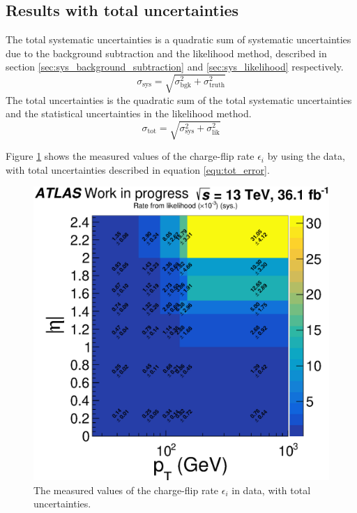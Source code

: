 \subsection{Results with total uncertainties}
\label{sec:charge_flip_results_stat}
The total systematic uncertainties is a quadratic sum of systematic uncertainties due to the background subtraction and the likelihood method, described in section \ref{sec:sys_background_subtraction} and \ref{sec:sys_likelihood} respectively.
\begin{equation}
\sigma_{\text{sys}} = \sqrt{\sigma_{\text{bgk}} ^2+ \sigma_{\text{truth}} ^2}
\end{equation}
The total uncertainties is the quadratic sum of the total systematic uncertainties and the statistical uncertainties in the likelihood method.
\begin{equation}
\sigma_{\text{tot}} = \sqrt{\sigma_{\text{sys}} ^2 + \sigma_{\text{lik}} ^2}
\label{equ:tot_error}
\end{equation}

Figure \ref{fig:charge_flip_data_tot} shows the measured values of the charge-flip rate $\epsilon_i$ by using the data, with total uncertainties described in equation \ref{equ:tot_error}.

\begin{figure}
\centering
\includegraphics[width=\textwidth]{data/plot/charge_flip/FitPlots/data_cf_rate_tot.eps}
\caption{The measured values of the charge-flip rate $\epsilon_i$ in data, with total uncertainties.}
\label{fig:charge_flip_data_tot}
\end{figure}

